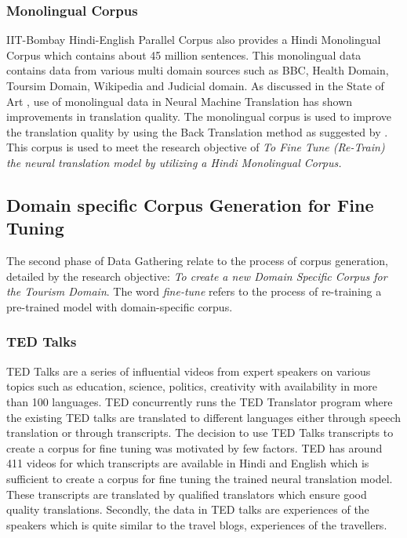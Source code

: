 \subsubsection{Monolingual Corpus}
\label{sec:mono}
IIT-Bombay Hindi-English Parallel Corpus also provides a Hindi Monolingual Corpus which contains about 45 million sentences. This monolingual data contains data from various multi domain sources such as BBC, Health Domain, Toursim Domain, Wikipedia and Judicial domain. As discussed in the State of Art , use of monolingual data in Neural Machine Translation has shown improvements in translation quality. The monolingual corpus is used to improve the translation quality by using the Back Translation method as suggested by \cite{DBLP:journals/corr/SennrichHB15a}. This corpus is used to meet the research objective of \textit{To Fine Tune (Re-Train) the neural translation model by utilizing a Hindi Monolingual Corpus.}

\subsection{Domain specific Corpus Generation for Fine Tuning}
The second phase of Data Gathering relate to the process of corpus generation, detailed by the research objective: \textit{To create a new Domain Specific Corpus for the Tourism Domain}. The word \textit{fine-tune} refers to the process of re-training a pre-trained model with domain-specific corpus.

\subsubsection{TED Talks} 
TED Talks are a series of influential videos from expert speakers on various topics such as education, science, politics, creativity with availability in more than 100 languages. TED concurrently runs the TED Translator program where the existing TED talks are translated to different languages either through speech translation or through transcripts. The decision to use TED Talks transcripts to create a corpus for fine tuning was motivated by few factors. TED has around 411 videos for which transcripts are available in Hindi and English which is sufficient to create a corpus for fine tuning the trained neural translation model. These transcripts are translated by qualified translators which ensure good quality translations. Secondly, the data in TED talks are experiences of the speakers which is quite similar to the travel blogs, experiences of the travellers.


